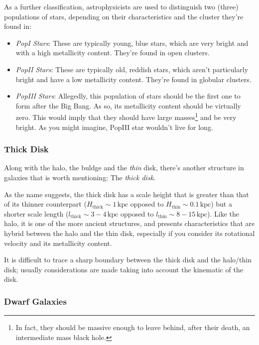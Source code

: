\par As a further classification, astrophysicists are used to distinguish two (three) populations of stars, depending on their characteristics and the cluster they're found in:
\begin{itemize}
	\item \emph{PopI Stars}: These are typically young, blue stars, which are very bright and with a high metallicity content. They're found in open clusters.
	\item \emph{PopII Stars}: These are typically old, reddish stars, which aren't particularly bright and have a low metallicity content. They're found in globular clusters.
	\item \emph{PopIII Stars}: Allegedly, this population of stars should be the first one to form after the Big Bang. As so, its metallicity content should be virtually zero. This would imply that they should have large masses\footnote{In fact, they should be massive enough to leave behind, after their death, an intermediate mass black hole.} and be very bright. As you might imagine, PopIII star wouldn't live for long.
\end{itemize} 

\subsubsection*{Thick Disk}

Along with the halo, the buldge and the \emph{thin} disk, there's another structure in galaxies that is worth mentioning: The \emph{thick disk}.
\par As the name suggests, the thick disk has a scale height that is greater than that of its thinner counterpart ($H_{\text{thick}} \sim 1\,\text{kpc}$ opposed to $H_{\text{thin}} \sim 0.1\,\text{kpc}$) but a shorter scale length ($l_{\text{thick}} \sim 3-4\,\text{kpc}$ opposed to $l_{\text{thin}} \sim 8-15\,\text{kpc}$). Like the halo, it is one of the more ancient structures, and presents characteristics that are hybrid between the halo and the thin disk, especially if you consider its rotational velocity and its metallicity content.
\par It is difficult to trace a sharp boundary between the thick disk and the halo/thin disk; usually considerations are made taking into account the kinematic of the disk.


\subsubsection*{Dwarf Galaxies}

